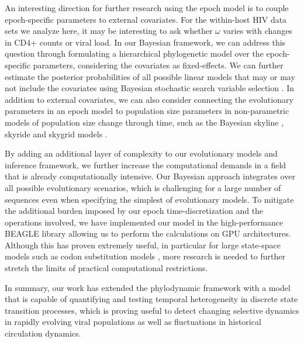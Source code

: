 An interesting direction for further research using the epoch model is to couple epoch-specific parameters to external covariates.
For the within-host HIV data sets we analyze here, it may be interesting to ask whether $\omega$ varies with changes in CD4+ counts or viral load.
In our Bayesian framework, we can address this question through formulating a hierarchical phylogenetic model \citep{Edo-Matas2011} over the epoch-specific parameters, considering the covariates as fixed-effects. 
We can further estimate the posterior probabilities of all possible linear models that may or may not include the covariates using Bayesian stochastic search variable selection \citep{Kuo1998}.  
In addition to external covariates, we can also consider connecting the evolutionary parameters in an epoch model to population size parameters in non-parametric models of population size change through time, such as the Bayesian skyline \citep{Drummond2005}, skyride \citep{Minin2008b} and skygrid models \citep{Gill2013}.

By adding an additional layer of complexity to our evolutionary models and inference framework, we further increase the computational demands in a field that is already computationally intensive. 
Our Bayesian approach integrates over all possible evolutionary scenarios, which is challenging for a large number of sequences even when specifying the simplest of evolutionary models.
To mitigate the additional burden imposed by our epoch time-discretization and the operations involved, we have implemented our model in the high-performance BEAGLE library allowing us to perform the calculations on GPU architectures.
Although this has proven extremely useful, in particular for large state-space models such as codon substitution models \citep{Suchard2009}, more research is needed to further stretch the limits of practical computational restrictions.
 
In summary, our work has extended the phylodynamic framework with a model that is capable of quantifying and testing temporal heterogeneity in discrete state transition processes, which is proving useful to detect changing selective dynamics in rapidly evolving viral populations as well as fluctuations in historical circulation dynamics.



